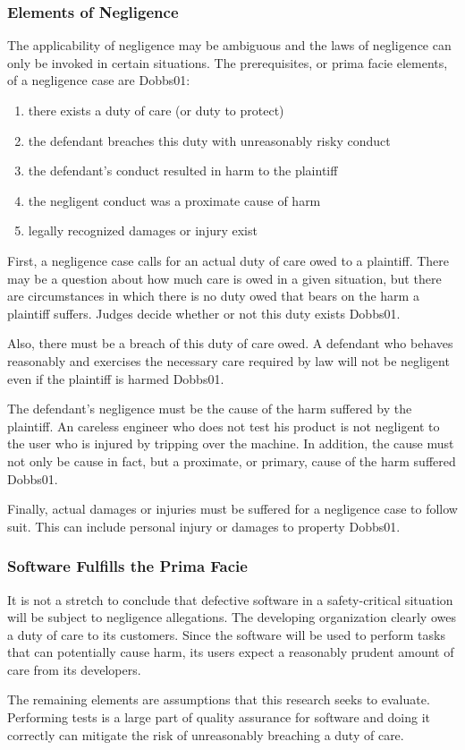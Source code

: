 \subsubsection{Elements of Negligence}\label{SS:Elements}
The applicability of negligence may be ambiguous and the laws of negligence can
only be invoked in certain situations. The prerequisites, or prima facie
elements, of a negligence case are \cite{refs}{Dobbs01}:

\singlespace
\begin{enumerate}
 \item there exists a duty of care (or duty to protect)
 \item the defendant breaches this duty with unreasonably risky conduct
 \item the defendant's conduct resulted in harm to the plaintiff
 \item the negligent conduct was a proximate cause of harm
 \item legally recognized damages or injury exist
\end{enumerate}
\doublespace

First, a negligence case calls for an actual duty of care owed to a plaintiff.
There may be a question about how much care is owed in a given situation, but
there are circumstances in which there is no duty owed that bears on the harm a
plaintiff suffers. Judges decide whether or not this duty exists \cite{refs}{Dobbs01}.

Also, there must be a breach of this duty of care owed. A defendant who behaves
reasonably and exercises the necessary care required by law will not be
negligent even if the plaintiff is harmed \cite{refs}{Dobbs01}.

The defendant's negligence must be the cause of the harm suffered by the
plaintiff. An careless engineer who does not test his product is not negligent
to the user who is injured by tripping over the machine. In addition, the cause
must not only be cause in fact, but a proximate, or primary, cause of the harm
suffered \cite{refs}{Dobbs01}.

Finally, actual damages or injuries must be suffered for a negligence case to
follow suit. This can include personal injury or damages to property
\cite{refs}{Dobbs01}.

\subsubsection{Software Fulfills the Prima Facie}

It is not a stretch to conclude that defective software in a safety-critical
situation will be subject to negligence allegations. The developing
organization clearly owes a duty of care to its customers. Since the software
will be used to perform tasks that can potentially cause harm, its users expect
a reasonably prudent amount of care from its developers.

The remaining elements are assumptions that this research seeks to evaluate.
Performing tests is a large part of quality assurance for software and doing it
correctly can mitigate the risk of unreasonably breaching a duty of care.

